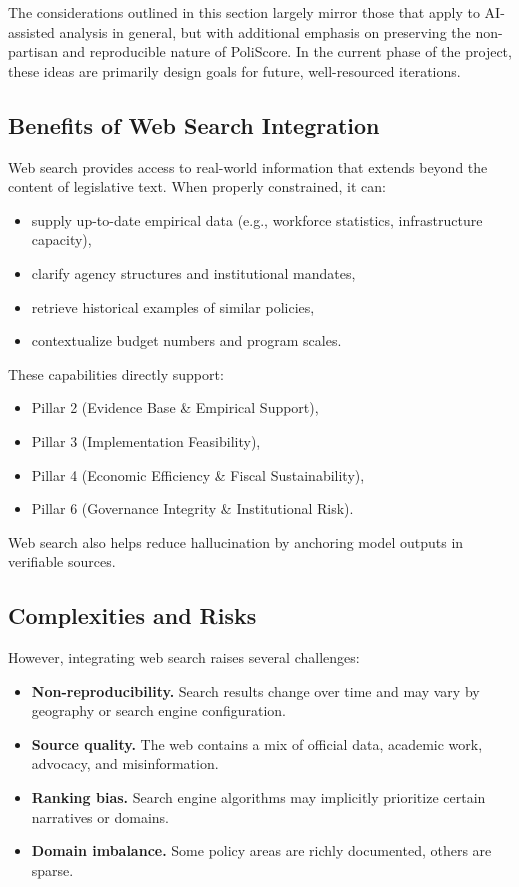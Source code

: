 \documentclass[12pt]{article}
\begin{document}
The considerations outlined in this section largely mirror those that apply to AI-assisted analysis in general, but with
additional emphasis on preserving the non-partisan and reproducible nature of PoliScore. In the current phase of the
project, these ideas are primarily design goals for future, well-resourced iterations.

\subsection{Benefits of Web Search Integration}

Web search provides access to real-world information that extends beyond the content of legislative text. When properly
constrained, it can:

\begin{itemize}
    \item supply up-to-date empirical data (e.g., workforce statistics, infrastructure capacity),
    \item clarify agency structures and institutional mandates,
    \item retrieve historical examples of similar policies,
    \item contextualize budget numbers and program scales.
\end{itemize}

These capabilities directly support:

\begin{itemize}
    \item Pillar 2 (Evidence Base \& Empirical Support),
    \item Pillar 3 (Implementation Feasibility),
    \item Pillar 4 (Economic Efficiency \& Fiscal Sustainability),
    \item Pillar 6 (Governance Integrity \& Institutional Risk).
\end{itemize}

Web search also helps reduce hallucination by anchoring model outputs in verifiable sources.

\subsection{Complexities and Risks}

However, integrating web search raises several challenges:

\begin{itemize}
    \item \textbf{Non-reproducibility.} Search results change over time and may vary by geography or search engine configuration.
    \item \textbf{Source quality.} The web contains a mix of official data, academic work, advocacy, and misinformation.
    \item \textbf{Ranking bias.} Search engine algorithms may implicitly prioritize certain narratives or domains.
    \item \textbf{Domain imbalance.} Some policy areas are richly documented, others are sparse.
\end{itemize}
\end{document}
